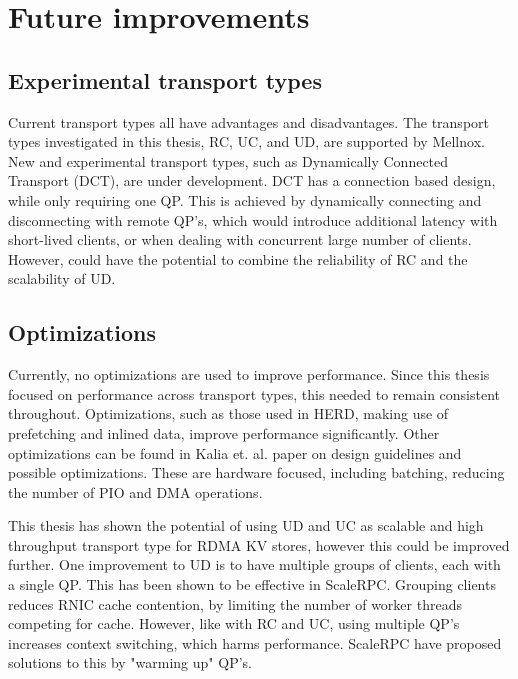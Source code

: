 
\chapter{Future improvements}\label{ch:future-improvements} %



\ifpdf
    \graphicspath{{7/figures/PNG/}{7/figures/PDF/}{7/figures/}}
\else
    \graphicspath{{7/figures/EPS/}{7/figures/}}
\fi


%
\section{Experimental transport types}
Current transport types all have advantages and disadvantages.
The transport types investigated in this thesis, RC, UC, and UD, are supported by Mellnox.
New and experimental transport types, such as Dynamically Connected Transport (DCT), are under development.
DCT has a connection based design, while only requiring one QP.
This is achieved by dynamically connecting and disconnecting with remote QP's, which would introduce additional latency with short-lived clients, or when dealing with concurrent large number of clients.
However, could have the potential to combine the reliability of RC and the scalability of UD.

\section{Optimizations}
Currently, no optimizations are used to improve performance.
Since this thesis focused on performance across transport types, this needed to remain consistent throughout.
Optimizations, such as those used in HERD, making use of prefetching and inlined data, improve performance significantly.
Other optimizations can be found in Kalia et. al. paper on design guidelines and possible optimizations\cite{kalia2016design}.
These are hardware focused, including batching, reducing the number of PIO and DMA operations.

This thesis has shown the potential of using UD and UC as scalable and high throughput transport type for RDMA KV stores, however this could be improved further.
One improvement to UD is to have multiple groups of clients, each with a single QP.
This has been shown to be effective in ScaleRPC\cite{chen2019scalable}.
Grouping clients reduces RNIC cache contention, by limiting the number of worker threads competing for cache.
However, like with RC and UC, using multiple QP's increases context switching, which harms performance.
ScaleRPC have proposed solutions to this by "warming up" QP's.

